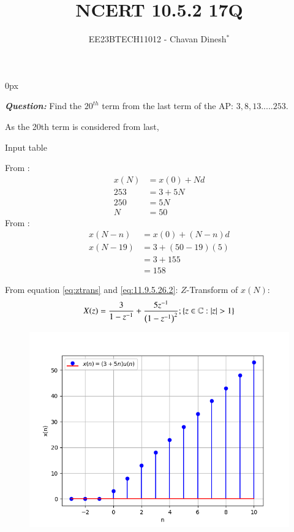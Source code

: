 \documentclass[journal,12pt,twocolumn]{IEEEtran}
\theoremstyle{remark}
\begin{document}
\parindent 0px

\vspace{3cm}

\title{NCERT 10.5.2 17Q}
\author{EE23BTECH11012 - Chavan Dinesh$^{*}$%
}
\maketitle
\newpage
\bigskip

\renewcommand{\thefigure}{\arabic{figure}}
\renewcommand{\thetable}{\arabic{table}}
\large\textbf{\textsl{Question:}}
Find the $20^{th}$ term from the last term of the AP: $3,8,13.....253$.

\solution

As the 20th term is considered from last, 

\begin{table}[htbp]
    \centering
    
    \caption{Input table}
    \label{tab:parameter_table.10.5.2.17}
\end{table}
From :
\begin{align}
    x(N)&=x(0) + Nd\\
    253 &= 3 + 5N \\
    250 &= 5N\\
     N  &= 50
\end{align}
From :
\begin{align}
x(N-n)&=x(0) + (N-n)d\\
x(N-19) &= 3 + (50 - 19)(5)\\
&= 3 + 155\\
&= 158
\end{align}

From equation \eqref{eq:ztrans} and \eqref{eq:11.9.5.26.2}:
\(Z\)-Transform of \(x(N)\):
\begin{align}
 X(z) =\frac{3}{1-z^{-1}}+ \frac{5z^{-1}}{\brak{1-z^{-1}}^2};\cbrak{z\in\mathbb{C} : |z|>1}
\end{align}

\begin{figure}[ht]
    \centering
    \includegraphics[width = \columnwidth]{figs/x(n)_vs_n.png}
    \caption{}
    \label{fig:graph1}
\end{figure}


\end{document}
